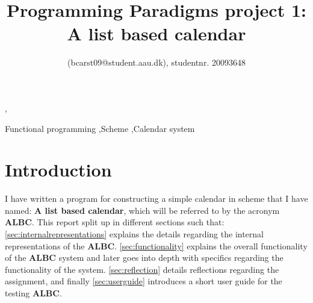 \documentclass{IOS-Book-Article}
\begin{document}

\newpage

\pagestyle{plain}
\setcounter{page}{1}

\begin{frontmatter}    

\title{Programming Paradigms project 1: \\ A list based calendar}

\author{  (bcarst09@student.aau.dk), studentnr. 20093648}, %

\address{Department of Computer Science, Aalborg University, Denmark}





\begin{keyword}
Functional programming \sep Scheme \sep Calendar system
\end{keyword}
\end{frontmatter}



\section{Introduction} \label{sec:introduction}
I have written a program for constructing a simple calendar in scheme that I have named: \textbf{A list based calendar}, which will be referred to by the acronym \textbf{ALBC}. 
This report split up in different sections such that: \autoref{sec:internalrepresentations} explains the details regarding the internal representations of the \textbf{ALBC}. \autoref{sec:functionality} explains the overall functionality of the \textbf{ALBC} system and later goes into depth with specifics regarding the functionality of the system. \autoref{sec:reflection} details reflections regarding the assignment, and finally \autoref{sec:userguide} introduces a short user guide for the testing \textbf{ALBC}. 
\end{document}
